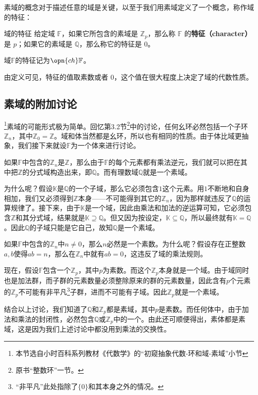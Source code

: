 素域的概念对于描述任意的域是关键，以至于我们用素域定义了一个概念，称作域的特征：

\begin{definition}{域的特征}\label{def_field_2}
给定域 $\mathbb{F}$，如果它所包含的素域是 $\mathbb{Z}_p$，那么称 $\mathbb{F}$ 的\textbf{特征（character）}是 $p$；如果它的素域是 $\mathbb{Q}$，那么称它的特征是 $0$。

域$\mathbb{F}$的特征记为$\opn{ch}\mathbb{F}$。
\end{definition}

由定义可见，特征的值取素数或者 $0$，这个值在很大程度上决定了域的代数性质。


\subsection{素域的附加讨论}

\footnote{本节选自小时百科系列教材《代数学》的“初窥抽象代数-环和域-素域”小节}素域的可能形式极为简单。回忆第3.2节\footnote{原书“整数环”一节。}中的讨论，任何幺环必然包括一个子环$\mathbb{Z}_n$，其中$\mathbb{Z}_0=\mathbb{Z}$。域和体当然都是幺环，所以也有相同的性质。由于体比域更抽象，我们接下来就设$\mathbb{F}$为一个体来进行讨论。

如果$\mathbb{F}$中包含的$\mathbb{Z}_n$是$\mathbb{Z}$，那么由于$\mathbb{F}$的每个元素都有乘法逆元，我们就可以把在其中把$\mathbb{Z}$的分式域构造出来，即$\mathbb{Q}$。而有理数域$\mathbb{Q}$就是一个素域。

为什么呢？假设$\mathbb{K}$是$\mathbb{Q}$的一个子域，那么它必须包含$1$这个元素。用$1$不断地和自身相加，我们又必须得到$\mathbb{Z}$本身——不可能得到其它的$\mathbb{Z}_n$，因为那样就违反了$\mathbb{Q}$的运算规律了。接下来，由于$\mathbb{K}$是一个域，因此由乘法和加法的逆运算可知，它必须包含$\mathbb{Z}$和其分式域，结果就是$\mathbb{K}\supseteq\mathbb{Q}$。但又因为按设定，$\mathbb{K}\subseteq\mathbb{Q}$，所以最终就有$\mathbb{K}=\mathbb{Q}$。因此$\mathbb{Q}$的子域只能是它自己，故知$\mathbb{Q}$是一个素域。

如果$\mathbb{F}$中包含的$\mathbb{Z}_n$中$n\neq 0$，那么$n$必然是一个素数。为什么呢？假设存在正整数$a, b$使得$ab=n$，那么在$\mathbb{Z}_n$中就有$ab=0$，这违反了域的乘法规则。

现在，假设$\mathbb{F}$包含一个$\mathbb{Z}_p$，其中$p$为素数。而这个$\mathbb{Z}_p$本身就是一个域。由于域同时也是加法群，而子群的元素数量必须整除原来的群的元素数量，因此含有$p$个元素的$\mathbb{Z}_p$不可能有非平凡\footnote{“非平凡”此处指除了$\{0\}$和其本身之外的情况。}子群，进而不可能有子域。因此$\mathbb{Z}_p$就是一个素域。

结合以上讨论，我们知道了$\mathbb{Q}$和$\mathbb{Z}_p$都是素域，其中$p$是素数。而任何体中，由于加法和乘法的封闭性，必然包含$\mathbb{Q}$或$\mathbb{Z}_p$中的一个。由此还可顺便得出，素体都是素域，这是因为我们上述讨论中都没用到乘法的交换性。












